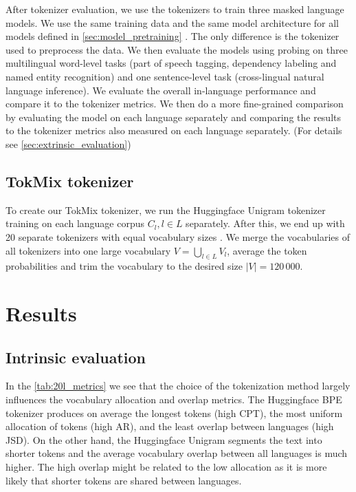 After tokenizer evaluation, we use the tokenizers to train three masked language models. We use the same training data and the same model architecture for all models defined in \autoref{sec:model_pretraining}  . The only difference is the tokenizer used to preprocess the data. We then evaluate the models using probing on three multilingual word-level tasks (part of speech tagging, dependency labeling and named entity recognition) and one sentence-level task (cross-lingual natural language inference).
We evaluate the overall in-language performance and compare it to the tokenizer metrics. We then do a more fine-grained comparison by evaluating the model on each language separately and comparing the results to the tokenizer metrics also measured on each language separately. (For details see \autoref{sec:extrinsic_evaluation}) 





\subsection{TokMix tokenizer}

To create our TokMix tokenizer, we run the Huggingface Unigram tokenizer training on each language corpus $C_l, l \in L$ separately. After this, we end up with 20 separate tokenizers with equal vocabulary sizes . We merge the vocabularies of all tokenizers into one large vocabulary $V = \bigcup_{l \in L} V_l$, average the token probabilities and trim the vocabulary to the desired size $|V| = 120\,000$. 

\section{Results}
\subsection{Intrinsic evaluation}



In the \autoref{tab:20l_metrics} we see that the choice of the tokenization method largely influences the vocabulary allocation and overlap metrics. The Huggingface BPE tokenizer produces on average the longest tokens (high CPT), the most uniform allocation of tokens (high AR), and the least overlap between languages (high JSD). On the other hand, the Huggingface Unigram segments the text into shorter tokens and the average vocabulary overlap between all languages is much higher. The high overlap might be related to the low allocation as it is more likely that shorter tokens are shared between languages. 


